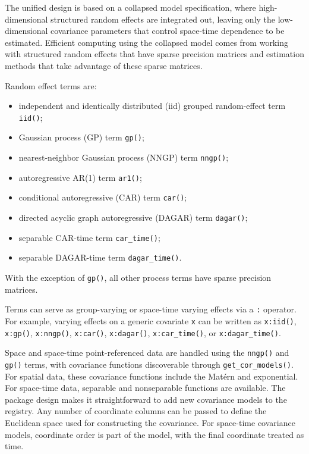 \documentclass[11pt]{article}
\begin{document}
The unified design is based on a collapsed model specification, where high-dimensional structured random effects are integrated out, leaving only the low-dimensional covariance parameters that control space-time dependence to be estimated. Efficient computing using the collapsed model comes from working with structured random effects that have sparse precision matrices and estimation methods that take advantage of these sparse matrices.

Random effect terms are:
\begin{itemize}
\item independent and identically distributed (iid) grouped random-effect term \texttt{iid()};
\item Gaussian process (GP) term \texttt{gp()};
\item nearest-neighbor Gaussian process (NNGP) term \texttt{nngp()};
\item autoregressive AR(1) term \texttt{ar1()};
\item conditional autoregressive (CAR) term \texttt{car()};
\item directed acyclic graph autoregressive (DAGAR) term \texttt{dagar()};
\item separable CAR-time term \texttt{car\_time()};
\item separable DAGAR-time term \texttt{dagar\_time()}.
\end{itemize}
With the exception of \texttt{gp()}, all other process terms have sparse precision matrices.

Terms can serve as group-varying or space-time varying effects via a \texttt{:} operator. For example, varying effects on a generic covariate \texttt{x} can be written as \texttt{x:iid()}, \texttt{x:gp()}, \texttt{x:nngp()}, \texttt{x:car()}, \texttt{x:dagar()}, \texttt{x:car\_time()}, or \texttt{x:dagar\_time()}.

Space and space-time point-referenced data are handled using the \texttt{nngp()} and \texttt{gp()} terms, with covariance functions discoverable through \texttt{get\_cor\_models()}. For spatial data, these covariance functions include the Mat{\'e}rn and exponential. For space-time data, separable and nonseparable functions are available. The package design makes it straightforward to add new covariance models to the registry. Any number of coordinate columns can be passed to define the Euclidean space used for constructing the covariance. For space-time covariance models, coordinate order is part of the model, with the final coordinate treated as time.
\end{document}
